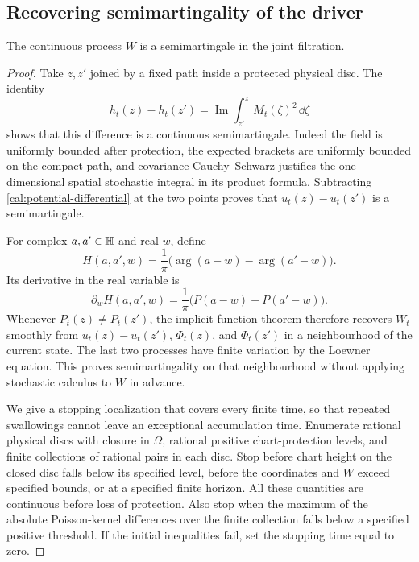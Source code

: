 \subsection{Recovering semimartingality of the driver}
\label{cal:recovery-subsection}

\begin{lemma}
\label{cal:recovery}
The continuous process $W$ is a semimartingale in the joint filtration.
\end{lemma}

\begin{proof}
Take $z,z'$ joined by a fixed path inside a protected physical disc.
The identity
\[
 h_t(z)-h_t(z')=\operatorname{Im}\int_{z'}^z M_t(\zeta)^2\,\dd\zeta
\]
shows that this difference is a continuous semimartingale.  Indeed the
field is uniformly bounded after protection, the expected brackets
are uniformly bounded on the compact path, and covariance
Cauchy--Schwarz justifies the one-dimensional spatial stochastic
integral in its product formula.  Subtracting
\eqref{cal:potential-differential} at the two points proves that
$u_t(z)-u_t(z')$ is a semimartingale.

For complex $a,a'\in\mathbb H$ and real $w$, define
\[
 H(a,a',w)=\frac1\pi\bigl(\arg(a-w)-\arg(a'-w)\bigr).
\]
Its derivative in the real variable is
\[
 \partial_wH(a,a',w)=\frac1\pi\bigl(P(a-w)-P(a'-w)\bigr).
\]
Whenever $P_t(z)\ne P_t(z')$, the implicit-function theorem therefore
recovers $W_t$ smoothly from
$u_t(z)-u_t(z')$, $\Phi_t(z)$, and $\Phi_t(z')$ in a neighbourhood of
the current state.  The last two processes have finite variation by
the Loewner equation.  This proves semimartingality on that
neighbourhood without applying stochastic calculus to $W$ in advance.

We give a stopping localization that covers every finite time, so
that repeated swallowings cannot leave an exceptional accumulation
time.  Enumerate rational physical discs with closure in $\Omega$,
rational positive chart-protection levels, and finite collections of
rational pairs in each disc.  Stop before chart height on the closed
disc falls below its specified level, before the coordinates and
$W$ exceed specified bounds, or at a specified finite horizon.  All
these quantities are continuous before loss of protection.  Also stop
when the maximum of the absolute Poisson-kernel differences over the
finite collection falls below a specified positive threshold.
If the initial inequalities fail, set the stopping time equal to zero.


\end{proof}
